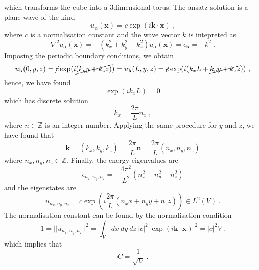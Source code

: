     which transforms the cube into a $3$dimensional-torus.
    The ansatz solution is a plane wave of the kind
    \begin{equation*}
        u_\alpha (\mathbf x) = c \exp(i \mathbf k \cdot \mathbf x) ~,
    \end{equation*}
    where $c$ is a normalisation constant and the wave vector $k$ is intepreted as
    \begin{equation*}
        \nabla^2 u_\alpha (\mathbf x) = - (k_x^2 + k_y^2 + k_z^2) u_\alpha (\mathbf x) = \epsilon_{\mathbf k} = - k^2 ~.
    \end{equation*}
    Imposing the periodic boundary conditions, we obtain 
    \begin{equation*}
        u_{\mathbf k} (0,y,z) = \cancel{c} \exp(i \cancel{(k_y y + k_z z)}) = u_{\mathbf k} (L,y,z) = \cancel{c} \exp(i (k_x L + \cancel{k_y y + k_z z})) ~,
    \end{equation*}
    hence, we have found
    \begin{equation*}
        \exp(i k_x L) = 0 
    \end{equation*}
    which has discrete solution 
    \begin{equation*}
        k_x = \frac{2 \pi}{L} n_x ~,
    \end{equation*}
    where $n \in \mathbb Z$ is an integer number. Applying the same procedure for $y$ and $z$, we have found that
    \begin{equation*}
        \mathbf k = (k_x, k_y, k_z) = \frac{2\pi}{L} \mathbf n = \frac{2\pi}{L} (n_x, n_y, n_z) 
    \end{equation*}
    where $n_x, n_y, n_z \in \mathbb Z$. Finally, the energy eigenvalues are 
    \begin{equation*}
        \epsilon_{n_x, n_y, n_z} = - \frac{4\pi^2}{L^2} (n_x^2 + n_y^2 + n_z^2) 
    \end{equation*}
    and the eigenstates are 
    \begin{equation*}
        u_{n_x, n_y, n_z} = c \exp(i \frac{2\pi}{L} (n_x x + n_y y + n_z z)) \in L^2(V) ~.
    \end{equation*}
    The normalisation constant can be found by the normalisation condition
    \begin{equation*}
        1 = ||u_{n_x, n_y, n_z} ||^2 = \int_V dx ~ dy ~ dz ~ |c|^2 |\exp(i \mathbf k \cdot \mathbf x)|^2 = |c|^2 V ~.
    \end{equation*}
    which implies that 
    \begin{equation*}
        C = \frac{1}{\sqrt{V}} ~.
    \end{equation*}
